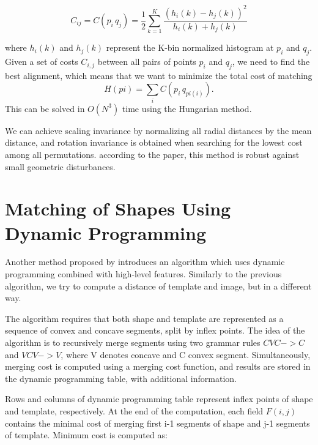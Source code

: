 \begin{description}
\begin{equation*}
C_{ij} =  C(p_{i}\,q_{j}) = \frac{1}{2} \sum_{k=1}^{K} \frac{(h_{i}(k) - h_{j}(k))^2}{h_{i}(k) + h_{j}(k)}
\end{equation*}

where $ h_{i}(k) $ and $ h_{j}(k) $ represent the K-bin normalized histogram at $p_{i}$ and $q_{j}$. Given a set of costs $C_{i,j}$ between all pairs of points $p_{i}$ and $q_{j}$, we need to find the best alignment, which means that we want to minimize the total cost of matching 
\begin{equation*}
H(pi) = \sum_{i} C(p_{i}\,q_{pi(i)}).
\end{equation*}
This can be solved in $O(N^3)$ time using the Hungarian method\cite{simple}. 

We can achieve scaling invariance by normalizing all radial distances by the mean distance, and rotation invariance is obtained when searching for the lowest cost among all permutations. according to the paper, this method is robust against small geometric disturbances.

\section{Matching of Shapes Using Dynamic Programming}
Another method proposed by \citet{convex} introduces an algorithm which uses dynamic programming combined with high-level features. Similarly to the previous algorithm, we try to compute a distance of template and image, but in a different way.

The algorithm requires that both shape and template are represented as a sequence of convex and concave segments, split by inflex points. The idea of the algorithm is to recursively merge segments using two grammar rules $CVC -> C$ and $VCV -> V$, where V denotes concave and C convex segment. Simultaneously, merging cost is computed using a merging cost function, and results are stored in the dynamic programming table, with additional information.

Rows and columns of dynamic programming table represent inflex points of shape and template, respectively. At the end of the computation, each field $F(i,j)$ contains the minimal cost of merging first i-1 segments of shape and j-1 segments of template. Minimum cost is computed as:


\end{description}
